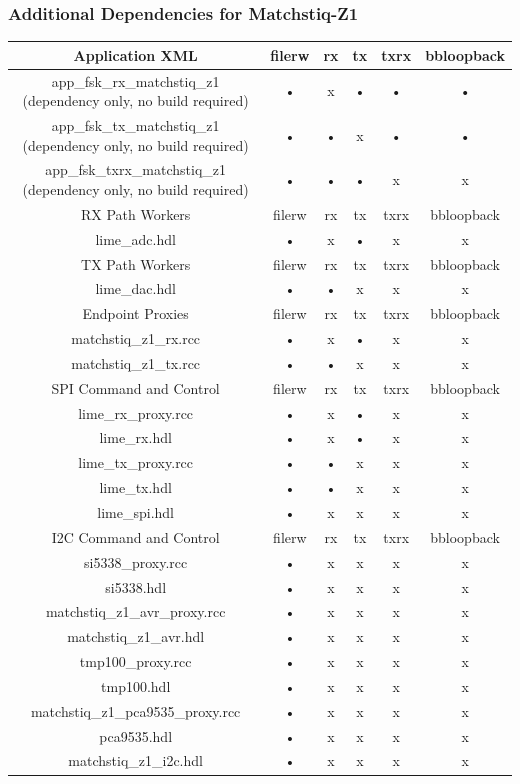 \subsubsection{Additional Dependencies for Matchstiq-Z1}
	\begin{tabular}{|c|c|c|c|c|c|}
	\hline
	\rowcolor{blue}
	Application XML & filerw & rx & tx & txrx & bbloopback \\
	\hline
	app\_fsk\_rx\_matchstiq\_z1 (dependency only, no build required) & • & x & • & • & • \\
	\hline
	app\_fsk\_tx\_matchstiq\_z1 (dependency only, no build required) & • & • & x & • & • \\
	\hline
	app\_fsk\_txrx\_matchstiq\_z1 (dependency only, no build required) & • & • & • & x & x \\
	\hline
	\rowcolor{blue}
	RX Path Workers & filerw & rx & tx & txrx & bbloopback \\
	\hline
	lime\_adc.hdl & • & x & • & x & x \\
	\hline
	\rowcolor{blue}
	TX Path Workers & filerw & rx & tx & txrx & bbloopback \\
	\hline
	lime\_dac.hdl & • & • & x & x & x \\
	\hline
	\rowcolor{blue}
	Endpoint Proxies & filerw & rx & tx & txrx & bbloopback \\
	\hline
	matchstiq\_z1\_rx.rcc & • & x & • & x & x \\
	\hline
	matchstiq\_z1\_tx.rcc & • & • & x & x & x \\
	\hline
	\rowcolor{blue}
	SPI Command and Control & filerw & rx & tx & txrx & bbloopback \\
	\hline
	lime\_rx\_proxy.rcc & • & x & • & x & x \\
	\hline
	lime\_rx.hdl & • & x & • & x & x \\
	\hline
	lime\_tx\_proxy.rcc & • & • & x & x & x \\
	\hline
	lime\_tx.hdl & • & • & x & x & x \\
	\hline
	lime\_spi.hdl & • & x & x & x & x \\
	\hline
	\rowcolor{blue}
	I2C Command and Control & filerw & rx & tx & txrx & bbloopback \\
	\hline
	si5338\_proxy.rcc & • & x & x & x & x \\
	\hline
	si5338.hdl & • & x & x & x & x \\
	\hline
	matchstiq\_z1\_avr\_proxy.rcc & • & x & x & x & x \\
	\hline
	matchstiq\_z1\_avr.hdl & • & x & x & x & x \\
	\hline
	tmp100\_proxy.rcc & • & x & x & x & x \\
	\hline
	tmp100.hdl & • & x & x & x & x \\
	\hline
	matchstiq\_z1\_pca9535\_proxy.rcc & • & x & x & x & x \\
	\hline
	pca9535.hdl & • & x & x & x & x \\
	\hline
	matchstiq\_z1\_i2c.hdl & • & x & x & x & x \\
	\hline
	\end{tabular}


